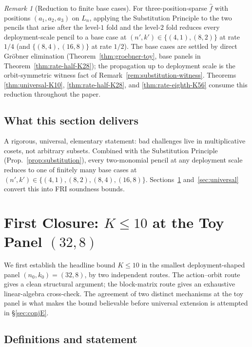 \documentclass[11pt]{article}
\theoremstyle{definition}
\theoremstyle{remark}
\newtheorem{remark}[theorem]{Remark}
\begin{document}
\begin{remark}[Reduction to finite base cases]
\label{rem:substitution-base-cases}
For three-position-sparse $\hat f$ with positions $(a_1, a_2, a_3)$ on
$L_n$, applying the Substitution Principle to the two pencils that
arise after the level-$1$ fold and the level-$2$ fold reduces every
deployment-scale pencil to a base case at $(n', k') \in \{(4, 1),
(8, 2)\}$ at rate $1/4$ (and $\{(8, 4), (16, 8)\}$ at rate $1/2$).
The base cases are settled by direct Gr\"obner elimination
(Theorem~\ref{thm:groebner-toy}, base panels in
Theorem~\ref{thm:rate-half-K28}); the propagation up to deployment
scale is the orbit-symmetric witness fact of
Remark~\ref{rem:substitution-witness}. Theorems
\ref{thm:universal-K10}, \ref{thm:rate-half-K28}, and
\ref{thm:rate-eighth-K56} consume this reduction throughout the paper.
\end{remark}

\subsection{What this section delivers}

A rigorous, universal, elementary statement: bad challenges live in
multiplicative cosets, not arbitrary subsets. Combined with the
Substitution Principle (Prop.~\ref{prop:substitution}), every two-monomial
pencil at any deployment scale reduces to one of finitely many base
cases at $(n', k') \in \{(4, 1), (8, 2), (8, 4), (16, 8)\}$.
Sections~\ref{sec:toy} and~\ref{sec:universal} convert this into FRI
soundness bounds.

\section{First Closure: $K \leq 10$ at the Toy Panel $(32, 8)$}
\label{sec:toy}

\noindent We first establish the headline bound $K \leq 10$ in the
smallest deployment-shaped panel $(n_0, k_0) = (32, 8)$, by two
independent routes. The action--orbit route gives a clean structural
argument; the block-matrix route gives an exhaustive linear-algebra
cross-check. The agreement of two distinct mechanisms at the toy
panel is what makes the bound believable before universal extension
is attempted in \S\ref{sec:conjE}.

\subsection{Definitions and statement}
\end{document}

